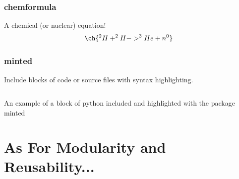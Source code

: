 \documentclass[titlepage, hidelinks, 12pt]{article}%
\begin{document}
        \subsubsection{chemformula}
            A chemical (or nuclear) equation!
            \begin{equation}
                \ch{
                ^{2}H + ^{2}H -> ^{3}He + n^{0}
                }
                \label{eqt:nucEnerReleased}
            \end{equation}

        \subsubsection{minted}
            Include blocks of code or source files with syntax highlighting.
            \begin{listing}[H]
                \inputminted{python}{./demo.py}
                \caption{An example of a block of python included and highlighted with the package minted}
                \label{lst:pythonExample}
            \end{listing}


    \section{As For Modularity and Reusability...}
\end{document}
